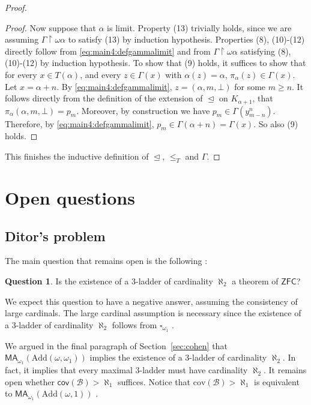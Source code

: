 \documentclass[]{amsart}
\theoremstyle{definition}
\newtheorem{question}{Question}
\theoremstyle{remark}
\begin{document}
\begin{proof}
\begin{proof}
Now suppose that $\alpha$ is limit. Property (13) trivially holds, since we are assuming $\Gamma \upharpoonright \omega\alpha$ to satisfy (13) by induction hypothesis. Properties (8), (10)-(12) directly follow from \eqref{eq:main4:defgammalimit} and from $\Gamma \upharpoonright \omega \alpha$ satisfying (8), (10)-(12) by induction hypothesis. To show that (9) holds, it suffices to show that for every $x \in T(\alpha)$, and every $z \in \Gamma(x)$ with $\alpha(z) = \alpha$, $\pi_\alpha (z) \in \Gamma(x)$. Let $x = \alpha + n$. By \eqref{eq:main4:defgammalimit}, $z = (\alpha, m, \bot)$ for some $m \ge n$. It follows directly from the definition of the extension of $\trianglelefteq$ on $K_{\alpha+1}$, that $\pi_\alpha(\alpha, m, \bot) = p_m$. Moreover, by construction we have $p_m \in \Gamma (y^n_{m-n})$. Therefore, by \eqref{eq:main4:defgammalimit}, $p_m \in \Gamma (\alpha + n) = \Gamma (x)$. So also (9) holds.
\end{proof}
This finishes the inductive definition of $\trianglelefteq$, $\le_T$ and $\Gamma$.
\end{proof}

\section{Open questions}\label{sec:openquestions}
\subsection{Ditor's problem}
The main question that remains open is the following \cite{MR2768581, MR2926318}:
\begin{question}\label{q:1}
Is the existence of a $3$-ladder of cardinality $\aleph_2$ a theorem of $\mathsf{ZFC}$?
\end{question}
We expect this question to have a negative answer, assuming the consistency of large cardinals. The large cardinal assumption is necessary since the existence of a $3$-ladder of cardinality $\aleph_2$ follows from $\square_{\omega_1}$ \cite{MR4993406}.

We argued in the final paragraph of Section~\ref{sec:cohen} that $\mathsf{MA}_{\omega_1}(\text{Add}(\omega, \omega_1))$ implies the existence of a $3$-ladder of cardinality $\aleph_2$. In fact, it implies that every maximal $3$-ladder must have cardinality $\aleph_2$. It remains open whether $\mathsf{cov}(\mathcal{B}) > \aleph_1$ suffices. Notice that $\mathrm{cov}(\mathcal{B}) > \aleph_1$ is equivalent to $\mathsf{MA}_{\omega_1}(\text{Add}(\omega, 1))$ \cite[Theorem 7.13]{MR2768685}.
\end{document}
